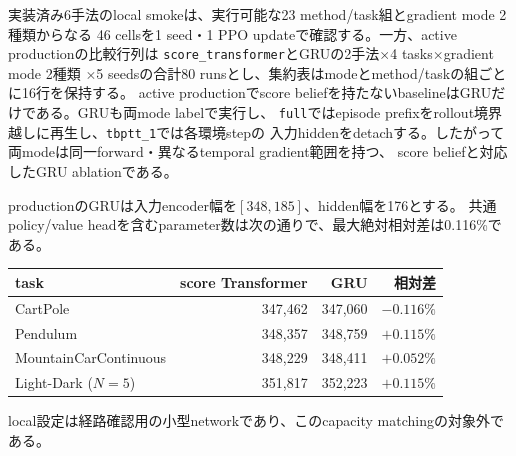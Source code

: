 \documentclass[a4paper,11pt]{article}
\begin{document}
実装済み6手法のlocal smokeは、実行可能な23 method/task組とgradient mode 2種類からなる
46 cellsを1 seed・1 PPO updateで確認する。一方、active productionの比較行列は
\texttt{score\_transformer}とGRUの2手法$\times$4 tasks$\times$gradient mode 2種類
$\times$5 seedsの合計80 runsとし、集約表はmodeとmethod/taskの組ごとに16行を保持する。
active productionでscore beliefを持たないbaselineはGRUだけである。GRUも両mode labelで実行し、
\texttt{full}ではepisode prefixをrollout境界越しに再生し、\texttt{tbptt\_1}では各環境stepの
入力hiddenをdetachする。したがって両modeは同一forward・異なるtemporal gradient範囲を持つ、
score beliefと対応したGRU ablationである。

productionのGRUは入力encoder幅を$[348,185]$、hidden幅を176とする。
共通policy/value headを含むparameter数は次の通りで、最大絶対相対差は0.116\%である。
\begin{center}
\begin{tabular}{lrrr}
\toprule
task & score Transformer & GRU & 相対差 \\
\midrule
CartPole & 347,462 & 347,060 & $-0.116\%$ \\
Pendulum & 348,357 & 348,759 & $+0.115\%$ \\
MountainCarContinuous & 348,229 & 348,411 & $+0.052\%$ \\
Light-Dark ($N=5$) & 351,817 & 352,223 & $+0.115\%$ \\
\bottomrule
\end{tabular}
\end{center}
local設定は経路確認用の小型networkであり、このcapacity matchingの対象外である。
\end{document}
